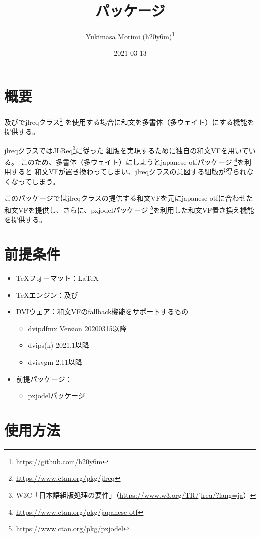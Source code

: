 \documentclass[dvipdfmx,a4paper]{jlreq}
\title{\pkg{jlreq-deluxe}パッケージ}
\author{Yukimasa Morimi (h20y6m)\thanks{\url{https://github.com/h20y6m}}}
\date{2021-03-13}
\newcommand{\pkg}[1]{\textsf{#1}}
\newcommand{\cls}[1]{\textsf{#1}}
\begin{document}
\maketitle


\section{概要}

\pLaTeX 及び\upLaTeX で\cls{jlreq}クラス\footnote{\url{https://www.ctan.org/pkg/jlreq}}%
を使用する場合に和文を多書体（多ウェイト）にする機能を提供する。

\cls{jlreq}クラスではJLReq\footnote{W3C「日本語組版処理の要件」（\url{https://www.w3.org/TR/jlreq/?lang=ja}）}に従った
組版を実現するために独自の和文VFを用いている。
このため、多書体（多ウェイト）にしようと\pkg{japanese-otf}パッケージ
\footnote{\url{https://www.ctan.org/pkg/japanese-otf}}を利用すると
和文VFが置き換わってしまい、\pkg{jlreq}クラスの意図する組版が得られなくなってしまう。

このパッケージでは\cls{jlreq}クラスの提供する和文VFを元に\pkg{japanese-otf}に合わせた
和文VFを提供し、さらに、\pkg{pxjodel}パッケージ
\footnote{\url{https://www.ctan.org/pkg/pxjodel}}を利用した和文VF置き換え機能を提供する。


\section{前提条件}

\begin{itemize}
\item \TeX フォーマット：\LaTeX
\item \TeX エンジン：\pTeX 及び\upTeX
\item DVIウェア：和文VFのfallback機能をサポートするもの
  \begin{itemize}
  \item dvipdfmx Version 20200315以降
  \item dvips(k) 2021.1以降
  \item dvisvgm 2.11以降
  \end{itemize}
\item 前提パッケージ：
  \begin{itemize}
  \item \pkg{pxjodel}パッケージ
  \end{itemize}
\end{itemize}


\section{使用方法}
\end{document}
